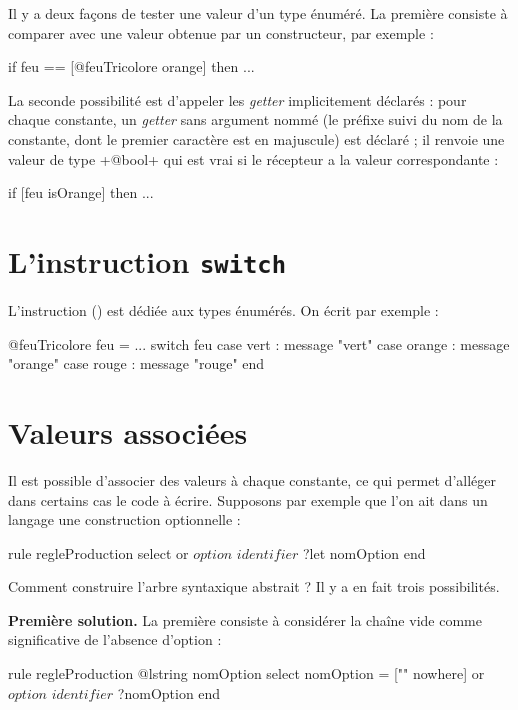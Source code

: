 
Il y a deux façons de tester une valeur d'un type énuméré. La première consiste à comparer avec une valeur obtenue par un constructeur, par exemple :
\begin{galgascode}
  if feu == [@feuTricolore orange] then ...
\end{galgascode}

La seconde possibilité est d'appeler les \emph{getter} implicitement déclarés : pour chaque constante, un \emph{getter} sans argument nommé   (le préfixe  suivi du nom de la constante, dont le premier caractère est en majuscule) est déclaré ; il renvoie une valeur de type \ggs+@bool+ qui est vrai si le récepteur a la valeur correspondante :
\begin{galgascode}
  if [feu isOrange] then ...
\end{galgascode}

\section{L'instruction \texttt{switch}}

L'instruction  () est dédiée aux types énumérés. On écrit par exemple :

\begin{galgascode}
@feuTricolore feu = ...
switch feu
case vert : message "vert"
case orange : message "orange"
case rouge : message "rouge" 
end
\end{galgascode}


\section{Valeurs associées}

Il est possible d'associer des valeurs à chaque constante, ce qui permet d'alléger dans certains cas le code à écrire. Supposons par exemple que l'on ait dans un langage une construction optionnelle :

\begin{galgascode}
rule regleProduction {
  select
  or
    $option$
    $identifier$ ?let nomOption
  end
}
\end{galgascode}

Comment construire l'arbre syntaxique abstrait ? Il y a en fait trois possibilités.

\textbf{Première solution.} La première consiste à considérer la chaîne vide comme significative de l'absence d'option :
\begin{galgascode}
rule regleProduction {
  @lstring nomOption
  select
    nomOption = ["" nowhere]
  or
    $option$
    $identifier$ ?nomOption
  end
}
\end{galgascode}

